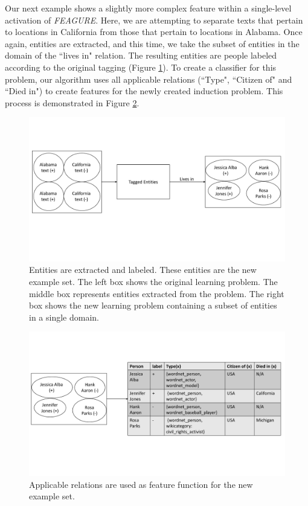 \documentclass[twoside,11pt]{article}
\theoremstyle{definition}
\begin{document}
Our next example shows a slightly more complex feature within a single-level activation of \emph{FEAGURE}. Here, we are attempting to separate texts that pertain to locations in California from those that pertain to locations in Alabama. 
Once again, entities are extracted, and this time, we take the subset of entities in the domain of the ``lives in" relation. The resulting entities are people labeled according to the original tagging (Figure \ref{fig:figure_rec2_example}).
To create a classifier for this problem, our algorithm uses all applicable relations (``Type", ``Citizen of" and ``Died in") to create features for the newly created induction problem. %
 This process is demonstrated in Figure \ref{fig:figure_rec2_problem}.

\begin{figure}[!h]
	\centering
	\includegraphics[width=\linewidth]{figure_rec2_example_new}
	\caption{Entities are extracted and labeled. These entities are the new example set. The left box shows the original learning problem. The middle box represents entities extracted from the problem. The right box shows the new learning problem containing a subset of entities in a single domain.}
	\label{fig:figure_rec2_example}
\end{figure}

\begin{figure}[!h]
	\centering
	\includegraphics[width=\linewidth]{figure_rec2_problem_new}
	\caption{Applicable relations are used as feature function for the new example set.}
	\label{fig:figure_rec2_problem}
\end{figure}
\end{document}
